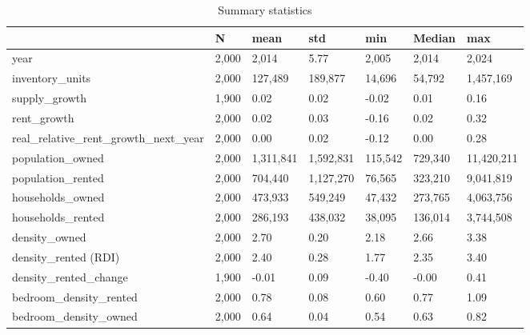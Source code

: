 \begin{table}
\caption{Summary statistics}
\label{tab:summary_stats}
\begin{tabular}{lllllll}
\toprule
 & N & mean & std & min & Median & max \\
\midrule
year & 2,000 & 2,014 & 5.77 & 2,005 & 2,014 & 2,024 \\
inventory\_units & 2,000 & 127,489 & 189,877 & 14,696 & 54,792 & 1,457,169 \\
supply\_growth & 1,900 & 0.02 & 0.02 & -0.02 & 0.01 & 0.16 \\
rent\_growth & 2,000 & 0.02 & 0.03 & -0.16 & 0.02 & 0.32 \\
real\_relative\_rent\_growth\_next\_year & 2,000 & 0.00 & 0.02 & -0.12 & 0.00 & 0.28 \\
population\_owned & 2,000 & 1,311,841 & 1,592,831 & 115,542 & 729,340 & 11,420,211 \\
population\_rented & 2,000 & 704,440 & 1,127,270 & 76,565 & 323,210 & 9,041,819 \\
households\_owned & 2,000 & 473,933 & 549,249 & 47,432 & 273,765 & 4,063,756 \\
households\_rented & 2,000 & 286,193 & 438,032 & 38,095 & 136,014 & 3,744,508 \\
density\_owned & 2,000 & 2.70 & 0.20 & 2.18 & 2.66 & 3.38 \\
density\_rented (RDI) & 2,000 & 2.40 & 0.28 & 1.77 & 2.35 & 3.40 \\
density\_rented\_change & 1,900 & -0.01 & 0.09 & -0.40 & -0.00 & 0.41 \\
bedroom\_density\_rented & 2,000 & 0.78 & 0.08 & 0.60 & 0.77 & 1.09 \\
bedroom\_density\_owned & 2,000 & 0.64 & 0.04 & 0.54 & 0.63 & 0.82 \\
\bottomrule
\end{tabular}
\end{table}

